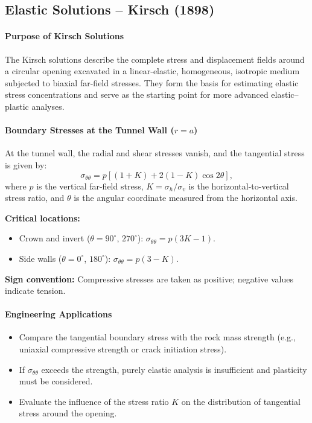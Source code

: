 \subsection{Elastic Solutions -- Kirsch (1898)}

\paragraph{Purpose of Kirsch Solutions}
The Kirsch solutions describe the complete stress and displacement fields around a circular opening excavated in a linear-elastic, homogeneous, isotropic medium subjected to biaxial far-field stresses. They form the basis for estimating elastic stress concentrations and serve as the starting point for more advanced elastic--plastic analyses.

\paragraph{Boundary Stresses at the Tunnel Wall ($r = a$)}
At the tunnel wall, the radial and shear stresses vanish, and the tangential stress is given by:
\[
\sigma_{\theta\theta} = p\left[(1 + K) + 2(1 - K)\cos 2\theta\right],
\]
where $p$ is the vertical far-field stress, $K = \sigma_h / \sigma_v$ is the horizontal-to-vertical stress ratio, and $\theta$ is the angular coordinate measured from the horizontal axis.

\textbf{Critical locations:}
\begin{itemize}
 \item Crown and invert ($\theta = 90^\circ$, $270^\circ$): $\sigma_{\theta\theta} = p(3K - 1)$.
 \item Side walls ($\theta = 0^\circ$, $180^\circ$): $\sigma_{\theta\theta} = p(3 - K)$.
\end{itemize}

\textbf{Sign convention:} Compressive stresses are taken as positive; negative values indicate tension.

\paragraph{Engineering Applications}
\begin{itemize}
 \item Compare the tangential boundary stress with the rock mass strength (e.g., uniaxial compressive strength or crack initiation stress).
 \item If $\sigma_{\theta\theta}$ exceeds the strength, purely elastic analysis is insufficient and plasticity must be considered.
 \item Evaluate the influence of the stress ratio $K$ on the distribution of tangential stress around the opening.
\end{itemize}

